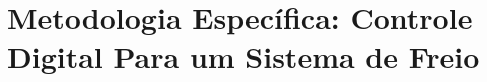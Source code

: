 \chapter{Metodologia Específica: Controle Digital Para um Sistema de Freio}
\label{cap:controle}





